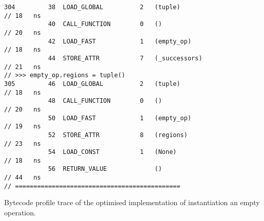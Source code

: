 \begin{code}
\begin{verbatim}
304         38  LOAD_GLOBAL          2   (tuple)                                            // 18   ns
            40  CALL_FUNCTION        0   ()                                                 // 20   ns
            42  LOAD_FAST            1   (empty_op)                                         // 18   ns
            44  STORE_ATTR           7   (_successors)                                      // 21   ns
// >>> empty_op.regions = tuple()
305         46  LOAD_GLOBAL          2   (tuple)                                            // 18   ns
            48  CALL_FUNCTION        0   ()                                                 // 20   ns
            50  LOAD_FAST            1   (empty_op)                                         // 19   ns
            52  STORE_ATTR           8   (regions)                                          // 23   ns
            54  LOAD_CONST           1   (None)                                             // 18   ns
            56  RETURN_VALUE             ()                                                 // 44   ns
// =============================================
    \end{verbatim}
    \caption{Bytecode profile trace of the optimised implementation of instantiation an empty operation.}
    \label{listing:bytecode-profiles-op-build-optimised}
\end{code}














